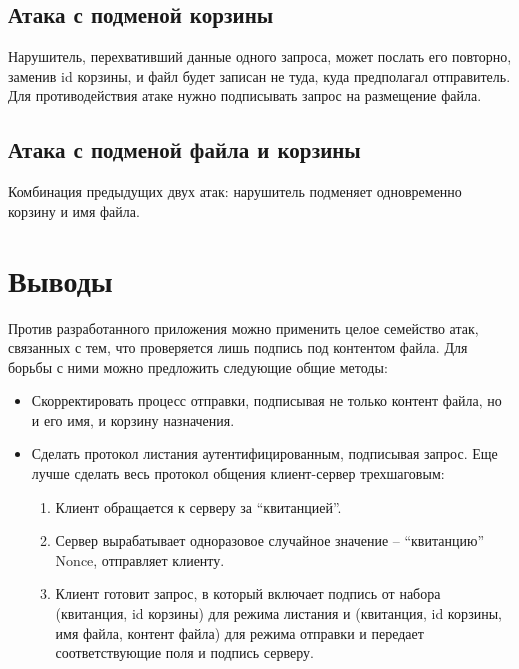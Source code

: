 \documentclass[a4paper,12pt]{article}
\begin{document}
\subsection{Атака с подменой корзины}

Нарушитель, перехвативший данные одного запроса, может послать его повторно, заменив id корзины, и файл будет записан не туда,
куда предполагал отправитель. Для противодействия атаке нужно подписывать запрос на размещение файла.

\subsection{Атака с подменой файла и корзины}

Комбинация предыдущих двух атак: нарушитель подменяет одновременно корзину и имя файла.

\section*{Выводы}

Против разработанного приложения можно применить целое семейство атак, связанных с тем, что проверяется лишь подпись под контентом файла.
Для борьбы с ними можно предложить следующие общие методы:
\begin{itemize}
\item Скорректировать процесс отправки, подписывая не только контент файла, но и его имя, и корзину назначения.
 \item Сделать протокол листания аутентифицированным, подписывая запрос. Еще лучше сделать весь протокол общения клиент-сервер трехшаговым:
 \begin{enumerate}
 \item Клиент обращается к серверу за ``квитанцией''.
  \item Сервер вырабатывает одноразовое случайное значение -- ``квитанцию'' Nonce, отправляет клиенту.
  \item Клиент готовит запрос, в который включает подпись от набора (квитанция, id корзины) для режима листания и
  (квитанция, id корзины, имя файла, контент файла) для режима отправки и передает соответствующие поля и подпись серверу. 
 \end{enumerate}

 \end{itemize}
\end{document}
